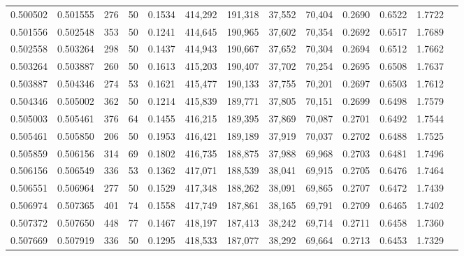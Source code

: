 \begin{tabular}{rrrrrrrrrrrrr}
0.500502 & 0.501555 &   276 &  50 &                                     0.1534 & 414,292 & 191,318 &  37,552 &  70,404 & 0.2690 & 0.6522 & 1.7722 \\
0.501556 & 0.502548 &   353 &  50 &                                     0.1241 & 414,645 & 190,965 &  37,602 &  70,354 & 0.2692 & 0.6517 & 1.7689 \\
0.502558 & 0.503264 &   298 &  50 &                                     0.1437 & 414,943 & 190,667 &  37,652 &  70,304 & 0.2694 & 0.6512 & 1.7662 \\
0.503264 & 0.503887 &   260 &  50 &                                     0.1613 & 415,203 & 190,407 &  37,702 &  70,254 & 0.2695 & 0.6508 & 1.7637 \\
0.503887 & 0.504346 &   274 &  53 &                                     0.1621 & 415,477 & 190,133 &  37,755 &  70,201 & 0.2697 & 0.6503 & 1.7612 \\
0.504346 & 0.505002 &   362 &  50 &                                     0.1214 & 415,839 & 189,771 &  37,805 &  70,151 & 0.2699 & 0.6498 & 1.7579 \\
0.505003 & 0.505461 &   376 &  64 &                                     0.1455 & 416,215 & 189,395 &  37,869 &  70,087 & 0.2701 & 0.6492 & 1.7544 \\
0.505461 & 0.505850 &   206 &  50 &                                     0.1953 & 416,421 & 189,189 &  37,919 &  70,037 & 0.2702 & 0.6488 & 1.7525 \\
0.505859 & 0.506156 &   314 &  69 &                                     0.1802 & 416,735 & 188,875 &  37,988 &  69,968 & 0.2703 & 0.6481 & 1.7496 \\
0.506156 & 0.506549 &   336 &  53 &                                     0.1362 & 417,071 & 188,539 &  38,041 &  69,915 & 0.2705 & 0.6476 & 1.7464 \\
0.506551 & 0.506964 &   277 &  50 &                                     0.1529 & 417,348 & 188,262 &  38,091 &  69,865 & 0.2707 & 0.6472 & 1.7439 \\
0.506974 & 0.507365 &   401 &  74 &                                     0.1558 & 417,749 & 187,861 &  38,165 &  69,791 & 0.2709 & 0.6465 & 1.7402 \\
0.507372 & 0.507650 &   448 &  77 &                                     0.1467 & 418,197 & 187,413 &  38,242 &  69,714 & 0.2711 & 0.6458 & 1.7360 \\
0.507669 & 0.507919 &   336 &  50 &                                     0.1295 & 418,533 & 187,077 &  38,292 &  69,664 & 0.2713 & 0.6453 & 1.7329 \\

\end{tabular}
